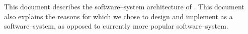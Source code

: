 \begin{center}
\parbox{42em}{
This document describes the \thickclient
software--system architecture of \yerotherpblack.
This document also explains the reasons for
which we chose to design and implement
\yerotherpblack as a \thickclient software--system,
as opposed to currently more popular
\webbrowserbased software--system.
}
\end{center}
